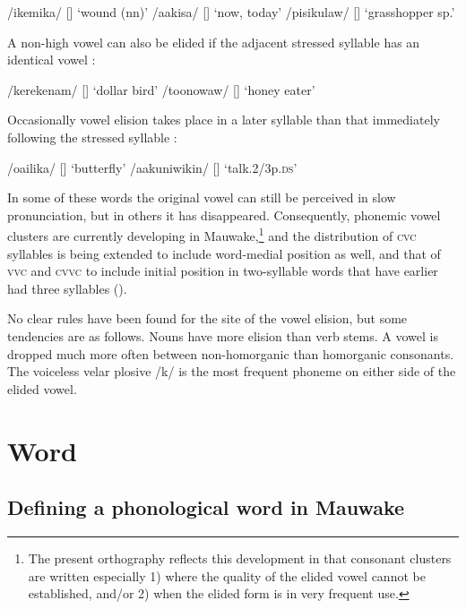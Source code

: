 \ea
\label{ex:2:vowelelision}
\ea
/ikemika/  []  `wound (nn)' 
\ex
/aakisa/  []  `now, today'
\ex
/pisikulaw/  []  `grasshopper sp.'
\z
\z


A non-high vowel can also be elided if the adjacent stressed syllable has an identical vowel :

\ea
\label{ex:2:vowelelisiontwo}
\ea
/kerekenam/  []  `dollar bird'
\ex
/toonowaw/  []  `honey eater'
\z
\z


Occasionally vowel elision takes place in a later syllable than that immediately following the stressed syllable : 

\ea
\label{ex:2:vowelelisionthree}
\ea
/o{\textphi}a{\textphi}ilika/  []  `butterfly'
\ex
/aakuniwikin/  []  `talk.2/3p.\textsc{ds}'
\z
\z

In some of these words the original vowel can still be perceived in slow pronunciation, but in others it has disappeared. Consequently, phonemic vowel clusters are currently developing in Mauwake,\footnote{The present orthography reflects this development in that consonant clusters are written especially 1) where the quality of the elided vowel cannot be established, and/or 2) when the elided form is in very frequent use.} and the distribution of \textsc{cvc} syllables is being extended to include word-medial position as well, and that of \textsc{vvc} and \textsc{cvvc} to include initial position in two-syllable words that have earlier had three syllables ().

No clear rules have been found for the site of the vowel elision, but some tendencies are as follows. Nouns have more elision than verb stems. A vowel is dropped much more often between non-homorganic than homorganic consonants. The voiceless velar plosive /k/ is the most frequent phoneme on either side of the elided vowel.

\section{Word}\label{sec:2.3}

\subsection{Defining a phonological word in Mauwake}

